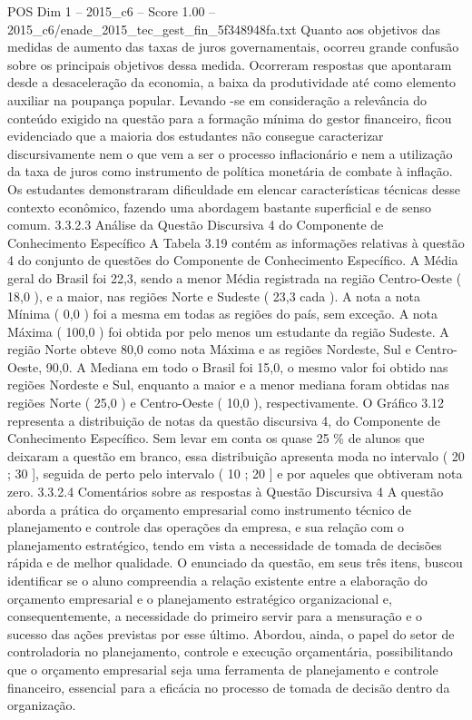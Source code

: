 \begin{textsample}{POS Dim 1 – 2015\_c6 – Score 1.00 – 2015\_c6/enade\_2015\_tec\_gest\_fin\_5f348948fa.txt}
Quanto aos objetivos das medidas de aumento das taxas de juros governamentais, ocorreu grande confusão sobre os principais objetivos dessa medida.
Ocorreram respostas que apontaram desde a desaceleração da economia, a baixa da produtividade até como elemento auxiliar na poupança popular.
Levando -se em consideração a relevância do conteúdo exigido na questão para a formação mínima do gestor financeiro, ficou evidenciado que a maioria dos estudantes não consegue caracterizar discursivamente nem o que vem a ser o processo inflacionário e nem a utilização da taxa de juros como instrumento de política monetária de combate à inflação.
Os estudantes demonstraram dificuldade em elencar características técnicas desse contexto econômico, fazendo uma abordagem bastante superficial e de senso comum. 3.3.2.3 Análise da Questão Discursiva 4 do Componente de Conhecimento Específico A Tabela 3.19 contém as informações relativas à questão 4 do conjunto de questões do Componente de Conhecimento Específico.
A Média geral do Brasil foi 22,3, sendo a menor Média registrada na região Centro-Oeste ( 18,0 ), e a maior, nas regiões Norte e Sudeste ( 23,3 cada ).
A nota a nota Mínima ( 0,0 ) foi a mesma em todas as regiões do país, sem exceção.
A nota Máxima ( 100,0 ) foi obtida por pelo menos um estudante da região Sudeste.
A região Norte obteve 80,0 como nota Máxima e as regiões Nordeste, Sul e Centro-Oeste, 90,0.
A Mediana em todo o Brasil foi 15,0, o mesmo valor foi obtido nas regiões Nordeste e Sul, enquanto a maior e a menor mediana foram obtidas nas regiões Norte ( 25,0 ) e Centro-Oeste ( 10,0 ), respectivamente.
O Gráfico 3.12 representa a distribuição de notas da questão discursiva 4, do Componente de Conhecimento Específico.
Sem levar em conta os quase 25 \% de alunos que deixaram a questão em branco, essa distribuição apresenta moda no intervalo ( 20 ; 30 ], seguida de perto pelo intervalo ( 10 ; 20 ] e por aqueles que obtiveram nota zero. 3.3.2.4 Comentários sobre as respostas à Questão Discursiva 4 A questão aborda a prática do orçamento empresarial como instrumento técnico de planejamento e controle das operações da empresa, e sua relação com o planejamento estratégico, tendo em vista a necessidade de tomada de decisões rápida e de melhor qualidade.
O enunciado da questão, em seus três itens, buscou identificar se o aluno compreendia a relação existente entre a elaboração do orçamento empresarial e o planejamento estratégico organizacional e, consequentemente, a necessidade do primeiro servir para a mensuração e o sucesso das ações previstas por esse último.
Abordou, ainda, o papel do setor de controladoria no planejamento, controle e execução orçamentária, possibilitando que o orçamento empresarial seja uma ferramenta de planejamento e controle financeiro, essencial para a eficácia no processo de tomada de decisão dentro da organização.

\end{textsample}
